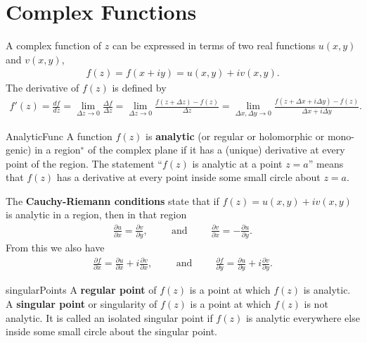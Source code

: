 \section{Complex Functions}
A complex function of $z$ can be expressed in terms of two real functions $u(x,y)$ and $v(x,y)$,
\begin{align}
	f(z) = f(x+iy) = u(x,y)+iv(x,y).
\end{align}
The derivative of $f(z)$ is defined by
\begin{align}
	f'(z) = \frac{df}{dz} = \lim\limits_{\Delta z \rightarrow 0}\frac{\Delta f}{\Delta z} =\lim\limits_{\Delta z \rightarrow 0} \frac{f(z+\Delta z)-f(z)}{\Delta z}=\lim\limits_{\Delta x, \Delta y \rightarrow 0} \frac{f(z+\Delta x+i\Delta y)-f(z)}{\Delta x+i\Delta y}.
\end{align}
\begin{defn}{AnalyticFunc}
A function $f(z)$ is \textbf{analytic} (or regular or holomorphic or mono-genic) in a region$^∗$ of the complex plane if it has a (unique) derivative at every point of the region. The statement “$f(z)$ is analytic at a point $z = a$” means that $f(z)$ has a derivative at every point inside some small circle about $z = a$.
\end{defn}
The \textbf{Cauchy-Riemann conditions} state that if $f(z) = u(x, y) + iv(x, y)$ is analytic in a region, then in that region
\begin{align}
	\frac{\partial u}{\partial x} = \frac{\partial v}{\partial y}, \hspace{1cm}\textrm{and}\hspace{1cm} \frac{\partial v}{\partial x} = - \frac{\partial u}{\partial y}.
\end{align}
From this we also have
\begin{align}
	\frac{\partial f}{\partial x} =\frac{\partial u}{\partial x} + i\frac{\partial v}{\partial x}, \hspace{1cm}\textrm{and}\hspace{1cm} \frac{\partial f}{\partial y} =\frac{\partial u}{\partial y} + i\frac{\partial v}{\partial y}.
\end{align}
\begin{defn}{singularPoints}
	A \textbf{regular point} of $f(z)$ is a point at which $f (z)$ is analytic.
	A \textbf{singular point} or singularity of $f (z)$ is a point at which $f (z)$ is not analytic.
	It is called an isolated singular point if $f (z)$ is analytic everywhere else inside
	some small circle about the singular point.
\end{defn}
